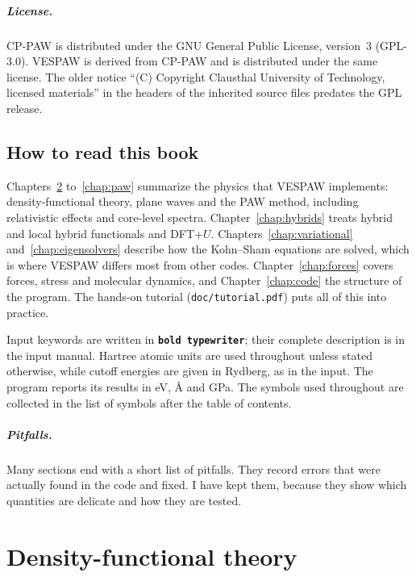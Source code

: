 \documentclass[11pt,a4paper,oneside]{book}
\newcommand{\key}[1]{\textbf{\texttt{#1}}}
\begin{document}
\paragraph{License.} CP-PAW is distributed under the GNU General Public
License, version~3 (GPL-3.0). VESPAW is derived from CP-PAW and is
distributed under the same license. The older notice ``(C) Copyright
Clausthal University of Technology, licensed materials'' in the headers
of the inherited source files predates the GPL release.

\section{How to read this book}

Chapters~\ref{chap:dft} to~\ref{chap:paw} summarize the physics that
VESPAW implements: density-functional theory, plane waves and the PAW
method, including relativistic effects and core-level spectra. Chapter~\ref{chap:hybrids} treats
hybrid and local hybrid functionals and DFT+$U$.
Chapters~\ref{chap:variational} and~\ref{chap:eigensolvers} describe how
the Kohn--Sham equations are solved, which is where VESPAW differs most
from other codes. Chapter~\ref{chap:forces} covers forces, stress and
molecular dynamics, and Chapter~\ref{chap:code} the structure of the
program. The hands-on tutorial (\texttt{doc/tutorial.pdf}) puts all of
this into practice.

Input keywords are written in \key{bold typewriter}; their complete
description is in the input manual. Hartree atomic units are used
throughout unless stated otherwise, while cutoff energies are given in
Rydberg, as in the input. The program reports its results in eV, \AA{}
and GPa. The symbols used throughout are collected in the list of
symbols after the table of contents.

\paragraph{Pitfalls.} Many sections end with a short list of pitfalls.
They record errors that were actually found in the code and fixed. I
have kept them, because they show which quantities are delicate and how
they are tested.

\chapter{Density-functional theory}\label{chap:dft}
\minitoc
\end{document}
